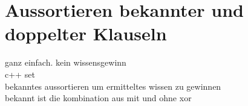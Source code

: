 \section{Aussortieren bekannter und doppelter Klauseln}
\label{sec:ana:rem_double}






ganz einfach. kein wissensgewinn\\
c++ set\\
bekanntes aussortieren um ermitteltes wissen zu gewinnen\\
bekannt ist die kombination aus mit und ohne xor